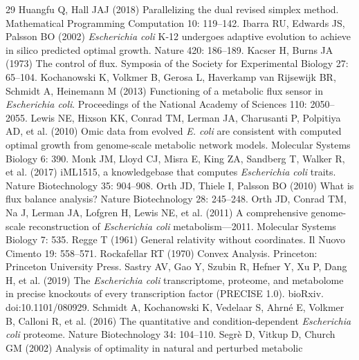 \begin{thebibliography}{29}
Huangfu Q, Hall JAJ (2018) Parallelizing the dual revised simplex method. Mathematical Programming Computation 10: 119--142.
Ibarra RU, Edwards JS, Palsson BO (2002) \emph{Escherichia coli} {K-12} undergoes adaptive evolution to
             achieve in silico predicted optimal growth. Nature 420: 186--189.
Kacser H, Burns JA (1973) The control of flux. Symposia of the Society for Experimental Biology 27: 65--104.
Kochanowski K, Volkmer B, Gerosa L, Haverkamp van Rijsewijk BR, Schmidt A, Heinemann M (2013) Functioning of a metabolic flux sensor in \emph{Escherichia
             coli}. Proceedings of the National Academy of Sciences 110: 2050--2055.
Lewis NE, Hixson KK, Conrad TM, Lerman JA, Charusanti P, Polpitiya AD, et al. (2010) Omic data from evolved \emph{E. coli} are consistent with
             computed optimal growth from genome-scale metabolic network
             models. Molecular Systems Biology 6: 390.
Monk JM, Lloyd CJ, Misra E, King ZA, Sandberg T, Walker R, et al. (2017) i{ML1515}, a knowledgebase that computes \emph{Escherichia
             coli} traits. Nature Biotechnology 35: 904--908.
Orth JD, Thiele I, Palsson BO (2010) What is flux balance analysis? Nature Biotechnology 28: 245--248.
Orth JD, Conrad TM, Na J, Lerman JA, Lofgren H, Lewis NE, et al. (2011) A comprehensive genome-scale reconstruction of \emph{Escherichia coli} metabolism---2011. Molecular Systems Biology 7: 535.
Regge T (1961) General relativity without coordinates. Il Nuovo Cimento 19: 558--571.
Rockafellar RT (1970) Convex Analysis. Princeton: Princeton University Press.
Sastry AV, Gao Y, Szubin R, Hefner Y, Xu P, Dang H, et al. (2019) The \emph{Escherichia coli} transcriptome, proteome, and
             metabolome in precise knockouts of every transcription
             factor (PRECISE 1.0). bioRxiv. doi:10.1101/080929.
Schmidt A, Kochanowski K, Vedelaar S, Ahrn{\'e} E, Volkmer B, Calloni R, et al. (2016) The quantitative and condition-dependent \emph{Escherichia
             coli} proteome. Nature Biotechnology 34: 104--110.
Segr{\`e} D, Vitkup D, Church GM (2002) Analysis of optimality in natural and perturbed metabolic

\end{thebibliography}
